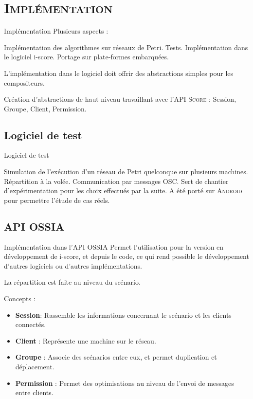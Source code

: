 \section{\scshape Implémentation}
\begin{frame}{Implémentation}
	Plusieurs aspects : 
	
	\begin{itemize}
		\itemar Implémentation des algorithmes sur réseaux de Petri.
		\itemar Tests.
		\itemar Implémentation dans le logiciel i-score.
		\itemar Portage sur plate-formes embarquées.
	\end{itemize}
	
	L'implémentation dans le logiciel doit offrir des abstractions simples pour les compositeurs.
	
	\begin{itemize}
		\itemar Création d'abstractions de haut-niveau travaillant avec l'\textsc{API Score} : Session, Groupe, Client, Permission.
	\end{itemize}
\end{frame}

\subsection{Logiciel de test}
\begin{frame}{Logiciel de test}
	\begin{itemize}
		\itemar Simulation de l'exécution d'un réseau de Petri quelconque sur plusieurs machines.
		\itemar Répartition à la volée.
		\itemar Communication par messages \textsc{OSC}.
		\itemar Sert de chantier d'expérimentation pour les choix effectués par la suite.
		\itemar A été porté sur \textsc{Android} pour permettre l'étude de cas réels.
	\end{itemize}
\end{frame}

\subsection{API OSSIA}
\begin{frame}{Implémentation dans l'API OSSIA}
	Permet l'utilisation pour la version en développement de i-score, et depuis le code, ce qui rend possible le développement d'autres logiciels ou d'autres implémentations.
	
	La répartition est faite au niveau du scénario.
	
	Concepts : 
	\begin{itemize}
		\item \textbf{Session}: Rassemble les informations concernant le scénario et les clients connectés. 
		\item \textbf{Client} :  Représente une machine sur le réseau.
		\item \textbf{Groupe} :  Associe des scénarios entre eux, et permet duplication et déplacement.
		\item \textbf{Permission} :  
		Permet des optimisations au niveau de l'envoi de messages entre clients.
		
	\end{itemize}
\end{frame}

